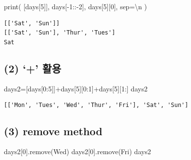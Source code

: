 \documentclass[
  letterpaper,
  DIV=11,
  numbers=noendperiod]{scrreprt}
\newenvironment{Shaded}{\begin{snugshade}}{\end{snugshade}}
\newcommand{\BuiltInTok}[1]{\textcolor[rgb]{0.00,0.23,0.31}{#1}}
\newcommand{\CharTok}[1]{\textcolor[rgb]{0.13,0.47,0.30}{#1}}
\newcommand{\DecValTok}[1]{\textcolor[rgb]{0.68,0.00,0.00}{#1}}
\newcommand{\NormalTok}[1]{\textcolor[rgb]{0.00,0.23,0.31}{#1}}
\newcommand{\OperatorTok}[1]{\textcolor[rgb]{0.37,0.37,0.37}{#1}}
\newcommand{\StringTok}[1]{\textcolor[rgb]{0.13,0.47,0.30}{#1}}
\begin{document}
\begin{Shaded}
\begin{Highlighting}[]
\BuiltInTok{print}\NormalTok{(}
\NormalTok{    [days[}\DecValTok{5}\NormalTok{]],}
\NormalTok{    days[}\OperatorTok{{-}}\DecValTok{1}\NormalTok{::}\OperatorTok{{-}}\DecValTok{2}\NormalTok{],}
\NormalTok{    days[}\DecValTok{5}\NormalTok{][}\DecValTok{0}\NormalTok{],}
\NormalTok{    sep}\OperatorTok{=}\StringTok{\textquotesingle{}}\CharTok{\textbackslash{}n}\StringTok{\textquotesingle{}}
\NormalTok{)}
\end{Highlighting}
\end{Shaded}

\begin{verbatim}
[['Sat', 'Sun']]
[['Sat', 'Sun'], 'Thur', 'Tues']
Sat
\end{verbatim}

\subsection*{(2) `+' 활용}\label{uxd65cuxc6a9}

\begin{Shaded}
\begin{Highlighting}[]
\NormalTok{days2}\OperatorTok{=}\NormalTok{[days[}\DecValTok{0}\NormalTok{:}\DecValTok{5}\NormalTok{]]}\OperatorTok{+}\NormalTok{days[}\DecValTok{5}\NormalTok{][}\DecValTok{0}\NormalTok{:}\DecValTok{1}\NormalTok{]}\OperatorTok{+}\NormalTok{days[}\DecValTok{5}\NormalTok{][}\DecValTok{1}\NormalTok{:]}
\NormalTok{days2}
\end{Highlighting}
\end{Shaded}

\begin{verbatim}
[['Mon', 'Tues', 'Wed', 'Thur', 'Fri'], 'Sat', 'Sun']
\end{verbatim}

\subsection*{(3) remove method}\label{remove-method}

\begin{Shaded}
\begin{Highlighting}[]
\NormalTok{days2[}\DecValTok{0}\NormalTok{].remove(}\StringTok{\textquotesingle{}Wed\textquotesingle{}}\NormalTok{)}
\NormalTok{days2[}\DecValTok{0}\NormalTok{].remove(}\StringTok{\textquotesingle{}Fri\textquotesingle{}}\NormalTok{)}
\NormalTok{days2}
\end{Highlighting}
\end{Shaded}
\end{document}
